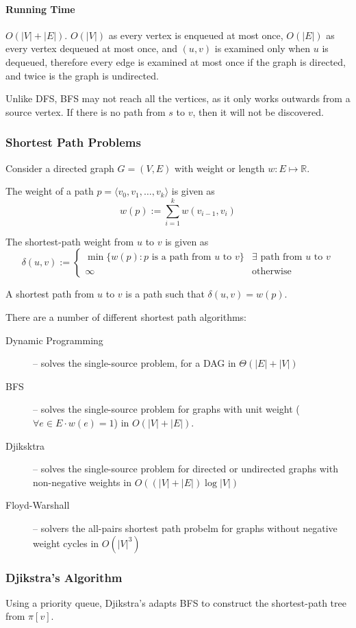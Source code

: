 \documentclass[10pt]{article}
\begin{document}
\paragraph{Running Time}$O(|V|+|E|)$.  $O(|V|)$ as every vertex is enqueued at most once, $O(|E|)$ as every vertex dequeued at most once, and $(u,v)$ is examined only when $u$ is dequeued, therefore every edge is examined at most once if the graph is directed, and twice is the graph is undirected.

Unlike DFS, BFS may not reach all the vertices, as it only works outwards from a source vertex.  If there is no path from $s$ to $v$, then it will not be discovered.
\subsubsection{Shortest Path Problems}
Consider a directed graph $G=(V,E)$ with weight or length $w:E\mapsto \mathbb R$.

The weight of a path $p=\langle v_0,v_1,\ldots,v_k\rangle$ is given as \[w(p):=\sum_{i=1}^k w(v_{i-1},v_i)\]

The shortest-path weight from $u$ to $v$ is given as
\[\delta(u,v) := \begin{cases} \min\{ w(p) : p \text{ is a path from $u$ to $v$}\} &\exists\text{ path from $u$ to $v$}\\\infty&\text{otherwise}\end{cases}\]

A shortest path from $u$ to $v$ is a path such that $\delta(u,v)=w(p)$.

There are a number of different shortest path algorithms:
\begin{description}
	\item[Dynamic Programming] -- solves the single-source problem, for a DAG in $\Theta(|E|+|V|)$
	\item[BFS] -- solves the single-source problem for graphs with unit weight ($\forall e\in E\cdot w(e)=1$) in $O(|V|+|E|)$.
	\item[Djiksktra] -- solves the single-source problem for directed or undirected graphs with non-negative weights in $O\left( \left( |V|+|E| \right)\log |V| \right)$
	\item[Floyd-Warshall] -- solvers the all-pairs shortest path probelm for graphs without negative weight cycles in $O\left(|V|^3\right)$
\end{description}
\subsubsection{Djikstra's Algorithm}
Using a priority queue, Djikstra's adapts BFS to construct the shortest-path tree from $\pi[v]$.
\end{document}
